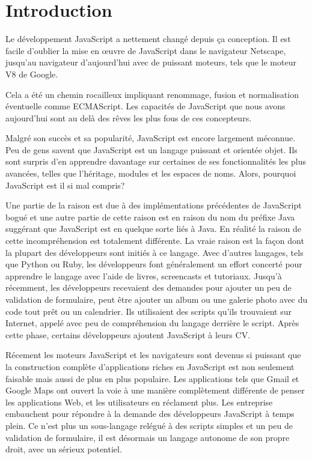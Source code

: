 \chapter{Introduction}
\label{ch:introduction}

Le développement JavaScript a nettement changé depuis ça conception. Il est facile d’oublier la mise en œuvre de JavaScript dans le navigateur Netscape, jusqu’au navigateur d’aujourd’hui avec de puissant moteurs, tels que le moteur V8 de Google.

Cela a été un chemin rocailleux impliquant renommage, fusion et normalisation éventuelle comme ECMAScript. Les capacités de JavaScript que nous avons aujourd’hui sont au delà des rêves les plus fous de ces concepteurs.

Malgré son succès et sa popularité, JavaScript est encore largement méconnue. Peu de gens savent que JavaScript est un langage puissant et orientée objet. Ils sont surpris d’en apprendre davantage sur certaines de ses fonctionnalités les plus avancées, telles que l’héritage, modules et les espaces de noms. Alors, pourquoi JavaScript est il si mal compris?

Une partie de la raison est due à des implémentations précédentes de JavaScript bogué et une autre partie de cette raison est en raison du nom du préfixe Java suggérant que JavaScript est en quelque sorte liés à Java. En réalité la raison de cette incompréhension est totalement différente. La vraie raison est la façon dont la plupart des développeurs sont initiés à ce langage. Avec d’autres langages, tels que Python ou Ruby, les développeurs font généralement un effort concerté pour apprendre le langage avec l’aide de livres, screencasts et tutoriaux. Jusqu’à récemment, les développeurs recevaient des demandes pour ajouter un peu de validation de formulaire, peut être ajouter un album ou une galerie photo avec du code tout prêt ou un calendrier.  Ils utilisaient des scripts qu’ils trouvaient sur Internet, appelé avec peu de compréhension du langage derrière le script. Après cette phase, certains développeurs ajoutent JavaScript à leurs CV.

Récement les moteurs JavaScript et les navigateurs sont devenus si puissant que la construction complète d’applications riches en JavaScript est non seulement faisable mais aussi de plus en plus populaire. Les applications tels que Gmail et Google Maps ont ouvert la voie à une manière complètement différente de penser les applications Web, et les utilisateurs en réclament plus. Les entreprise embauchent pour répondre à la demande des développeurs JavaScript à temps plein. Ce n’est plus un sous-langage relégué à des scripts simples et un peu de validation de formulaire, il est désormais un langage autonome de son propre droit, avec un sérieux potentiel.

